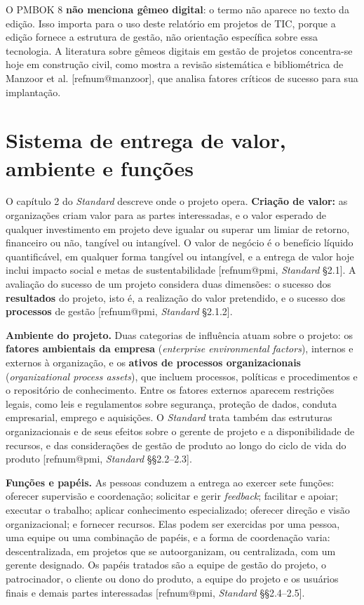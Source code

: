 \documentclass[11pt,a4paper]{article}
\makeatletter
\newcommand{\refnum}[1]{\csname refnum@#1\endcsname}
\makeatother
\begin{document}
O PMBOK 8 \textbf{não menciona gêmeo digital}: o termo não aparece no texto da edição. Isso importa para o uso deste relatório em projetos de TIC, porque a edição fornece a estrutura de gestão, não orientação específica sobre essa tecnologia. A literatura sobre gêmeos digitais em gestão de projetos concentra-se hoje em construção civil, como mostra a revisão sistemática e bibliométrica de Manzoor et al. [\refnum{manzoor}], que analisa fatores críticos de sucesso para sua implantação.

\section{Sistema de entrega de valor, ambiente e funções}

O capítulo 2 do \textit{Standard} descreve onde o projeto opera. \textbf{Criação de valor:} as organizações criam valor para as partes interessadas, e o valor esperado de qualquer investimento em projeto deve igualar ou superar um limiar de retorno, financeiro ou não, tangível ou intangível. O valor de negócio é o benefício líquido quantificável, em qualquer forma tangível ou intangível, e a entrega de valor hoje inclui impacto social e metas de sustentabilidade [\refnum{pmi}, \textit{Standard} §2.1]. A avaliação do sucesso de um projeto considera duas dimensões: o sucesso dos \textbf{resultados} do projeto, isto é, a realização do valor pretendido, e o sucesso dos \textbf{processos} de gestão [\refnum{pmi}, \textit{Standard} §2.1.2].

\textbf{Ambiente do projeto.} Duas categorias de influência atuam sobre o projeto: os \textbf{fatores ambientais da empresa} (\textit{enterprise environmental factors}), internos e externos à organização, e os \textbf{ativos de processos organizacionais} (\textit{organizational process assets}), que incluem processos, políticas e procedimentos e o repositório de conhecimento. Entre os fatores externos aparecem restrições legais, como leis e regulamentos sobre segurança, proteção de dados, conduta empresarial, emprego e aquisições. O \textit{Standard} trata também das estruturas organizacionais e de seus efeitos sobre o gerente de projeto e a disponibilidade de recursos, e das considerações de gestão de produto ao longo do ciclo de vida do produto [\refnum{pmi}, \textit{Standard} §§2.2–2.3].

\textbf{Funções e papéis.} As pessoas conduzem a entrega ao exercer sete funções: oferecer supervisão e coordenação; solicitar e gerir \textit{feedback}; facilitar e apoiar; executar o trabalho; aplicar conhecimento especializado; oferecer direção e visão organizacional; e fornecer recursos. Elas podem ser exercidas por uma pessoa, uma equipe ou uma combinação de papéis, e a forma de coordenação varia: descentralizada, em projetos que se autoorganizam, ou centralizada, com um gerente designado. Os papéis tratados são a equipe de gestão do projeto, o patrocinador, o cliente ou dono do produto, a equipe do projeto e os usuários finais e demais partes interessadas [\refnum{pmi}, \textit{Standard} §§2.4–2.5].
\end{document}
